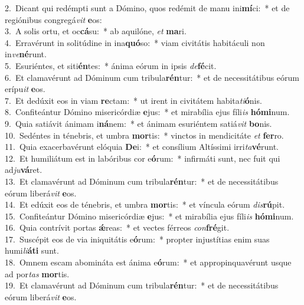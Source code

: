 {2.~}Dicant qui redémpti sunt a Dómino, quos redémit de manu ini\textbf{mí}ci:~* et de regiónibus congregá\textit{vit} \textbf{e}os:\\
{3.~}A solis ortu, et oc\textbf{cá}su:~* ab aquilóne, \textit{et} \textbf{ma}ri.\\
{4.~}Erravérunt in solitúdine in ina\textbf{quó}so:~* viam civitátis habitáculi non in\textit{ve}\textbf{né}runt.\\
{5.~}Esuriéntes, et siti\textbf{én}tes:~* ánima eórum in ipsis \textit{de}\textbf{fé}cit.\\
{6.~}Et clamavérunt ad Dóminum cum tribula\textbf{rén}tur:~* et de necessitátibus eórum erípu\textit{it} \textbf{e}os.\\
{7.~}Et dedúxit eos in viam \textbf{re}ctam:~* ut irent in civitátem habita\textit{ti}\textbf{ó}nis.\\
{8.~}Confiteántur Dómino misericórdiæ \textbf{e}jus:~* et mirabília ejus fíli\textit{is} \textbf{hó}\textbf{mi}num.\\
{9.~}Quia satiávit ánimam i\textbf{ná}nem:~* et ánimam esuriéntem satiá\textit{vit} \textbf{bo}nis.\\
{10.~}Sedéntes in ténebris, et umbra \textbf{mor}tis:~* vinctos in mendicitáte \textit{et} \textbf{fer}ro.\\
{11.~}Quia exacerbavérunt elóquia \textbf{De}i:~* et consílium Altíssimi irri\textit{ta}\textbf{vé}runt.\\
{12.~}Et humiliátum est in labóribus cor e\textbf{ó}rum:~* infirmáti sunt, nec fuit qui ad\textit{ju}\textbf{vá}ret.\\
{13.~}Et clamavérunt ad Dóminum cum tribula\textbf{rén}tur:~* et de necessitátibus eórum liberá\textit{vit} \textbf{e}os.\\
{14.~}Et edúxit eos de ténebris, et umbra \textbf{mor}tis:~* et víncula eórum \textit{dis}\textbf{rú}pit.\\
{15.~}Confiteántur Dómino misericórdiæ \textbf{e}jus:~* et mirabília ejus fíli\textit{is} \textbf{hó}\textbf{mi}num.\\
{16.~}Quia contrívit portas \textbf{ǽ}reas:~* et vectes férreos \textit{con}\textbf{fré}git.\\
{17.~}Suscépit eos de via iniquitátis e\textbf{ó}rum:~* propter injustítias enim suas humi\textit{li}\textbf{á}\textbf{ti} sunt.\\
{18.~}Omnem escam abomináta est ánima e\textbf{ó}rum:~* et appropinquavérunt usque ad por\textit{tas} \textbf{mor}tis.\\
{19.~}Et clamavérunt ad Dóminum cum tribula\textbf{rén}tur:~* et de necessitátibus eórum liberá\textit{vit} \textbf{e}os.\\
